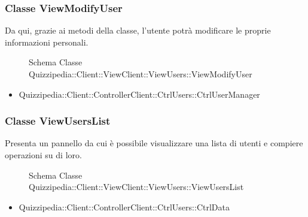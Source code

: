 \subsubsection{Classe ViewModifyUser}
Da qui, grazie ai metodi della classe, l'utente potrà modificare le proprie informazioni personali.
\begin{figure}[H]
\centering
\noindent{}
\caption[Schema Classe ViewModifyUser]{Schema Classe Quizzipedia::Client::ViewClient::ViewUsers::ViewModifyUser}
\end{figure}
\begin{itemize}
\item Quizzipedia::Client::ControllerClient::CtrlUsers::CtrlUserManager
\end{itemize}
\subsubsection{Classe ViewUsersList}
Presenta un pannello da cui è possibile visualizzare una lista di utenti e compiere operazioni su di loro.
\begin{figure}[H]
\centering
\noindent{}
\caption[Schema Classe ViewUsersList]{Schema Classe Quizzipedia::Client::ViewClient::ViewUsers::ViewUsersList}
\end{figure}
\begin{itemize}
\item Quizzipedia::Client::ControllerClient::CtrlUsers::CtrlData
\end{itemize}
